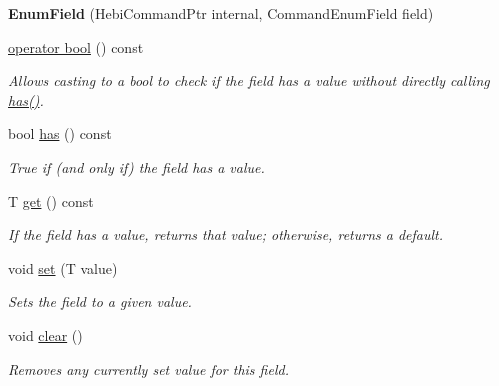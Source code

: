 \begin{DoxyCompactItemize}
\item 
{\bfseries Enum\+Field} (Hebi\+Command\+Ptr internal, Command\+Enum\+Field field)\hypertarget{classhebi_1_1Command_1_1EnumField_aa2a658eb3d71afcdeb2a47a65414bb89}{}\label{classhebi_1_1Command_1_1EnumField_aa2a658eb3d71afcdeb2a47a65414bb89}

\item 
\hyperlink{classhebi_1_1Command_1_1EnumField_aef3f83474be1d547c835e7c7ea8169ef}{operator bool} () const 
\begin{DoxyCompactList}\small\item\em Allows casting to a bool to check if the field has a value without directly calling {\ttfamily \hyperlink{classhebi_1_1Command_1_1EnumField_a9dde151d6155a016ba0d79b7dca0488a}{has()}}. \end{DoxyCompactList}\item 
bool \hyperlink{classhebi_1_1Command_1_1EnumField_a9dde151d6155a016ba0d79b7dca0488a}{has} () const \hypertarget{classhebi_1_1Command_1_1EnumField_a9dde151d6155a016ba0d79b7dca0488a}{}\label{classhebi_1_1Command_1_1EnumField_a9dde151d6155a016ba0d79b7dca0488a}

\begin{DoxyCompactList}\small\item\em True if (and only if) the field has a value. \end{DoxyCompactList}\item 
T \hyperlink{classhebi_1_1Command_1_1EnumField_a1ee97c72049de10f4cd0541d395d6286}{get} () const \hypertarget{classhebi_1_1Command_1_1EnumField_a1ee97c72049de10f4cd0541d395d6286}{}\label{classhebi_1_1Command_1_1EnumField_a1ee97c72049de10f4cd0541d395d6286}

\begin{DoxyCompactList}\small\item\em If the field has a value, returns that value; otherwise, returns a default. \end{DoxyCompactList}\item 
void \hyperlink{classhebi_1_1Command_1_1EnumField_abdd656f051b4fc58cfc206ceb07a5b17}{set} (T value)\hypertarget{classhebi_1_1Command_1_1EnumField_abdd656f051b4fc58cfc206ceb07a5b17}{}\label{classhebi_1_1Command_1_1EnumField_abdd656f051b4fc58cfc206ceb07a5b17}

\begin{DoxyCompactList}\small\item\em Sets the field to a given value. \end{DoxyCompactList}\item 
void \hyperlink{classhebi_1_1Command_1_1EnumField_aa05f2160dbc34d73877ee308f71130a1}{clear} ()\hypertarget{classhebi_1_1Command_1_1EnumField_aa05f2160dbc34d73877ee308f71130a1}{}\label{classhebi_1_1Command_1_1EnumField_aa05f2160dbc34d73877ee308f71130a1}

\begin{DoxyCompactList}\small\item\em Removes any currently set value for this field. \end{DoxyCompactList}\end{DoxyCompactItemize}


